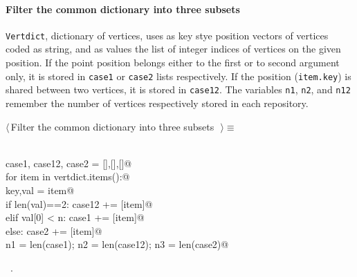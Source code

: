\documentclass[11pt,oneside]{article}	%
\begin{document}
\paragraph{Filter the common dictionary into three subsets}
\texttt{Vertdict}, dictionary of vertices, uses as key stye position vectors of vertices coded as string, and as values the list of integer indices of vertices on the given position. If the point position belongs either to the first or to second argument only, it is stored in \texttt{case1} or \texttt{case2} lists respectively. If the position (\texttt{item.key}) is shared between two vertices, it is stored in \texttt{case12}.
The variables \texttt{n1}, \texttt{n2}, and \texttt{n12} remember the number of vertices respectively stored in each repository.
\begin{flushleft} \small \label{scrap5}
$\langle\,$Filter the common dictionary into three subsets\nobreak\ {\footnotesize {}}$\,\rangle\equiv$
\vspace{-1ex}
\begin{list}{}{} \item
\mbox{}\verb@@\\
\mbox{}\verb@   case1, case12, case2 = [],[],[]@\\
\mbox{}\verb@   for item in vertdict.items():@\\
\mbox{}\verb@      key,val = item@\\
\mbox{}\verb@      if len(val)==2:  case12 += [item]@\\
\mbox{}\verb@      elif val[0] < n: case1 += [item]@\\
\mbox{}\verb@      else: case2 += [item]@\\
\mbox{}\verb@   n1 = len(case1); n2 = len(case12); n3 = len(case2)@\\
\mbox{}\verb@@{\NWsep}
\end{list}
\vspace{-1ex}
\footnotesize\addtolength{\baselineskip}{-1ex}
\begin{list}{}{\setlength{\itemsep}{-\parsep}\setlength{\itemindent}{-\leftmargin}}
\item \NWtxtMacroRefIn\ .
\end{list}
\end{flushleft}
\end{document}

